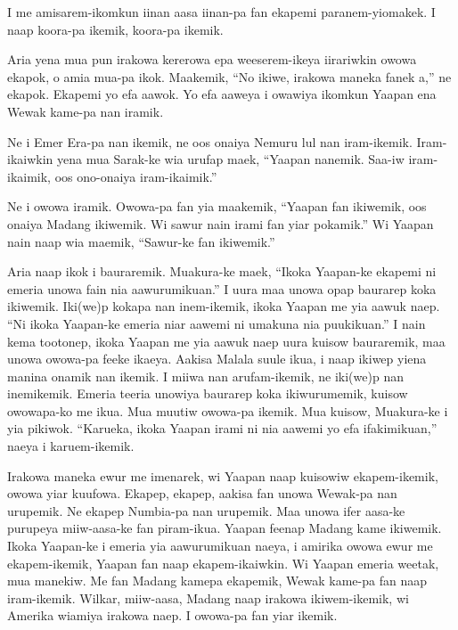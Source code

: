 I  me  amisarem-ikomkun  iinan  aasa  iinan-pa  fan  ekapemi  paranem-yiomakek. 
I  naap  koora-pa  ikemik,  koora-pa  ikemik. 

Aria  yena  mua  pun  irakowa  kererowa  epa weeserem-ikeya  iirariwkin  owowa  ekapok, o  amia  mua-pa  ikok. 
Maakemik,  “No  ikiwe,  irakowa  maneka  fanek a,”  ne  ekapok. 
Ekapemi  yo  efa  aawok. 
Yo  efa  aaweya  i  owawiya  ikomkun   Yaapan ena  Wewak  kame-pa  nan  iramik.

Ne  i  Emer  Era-pa  nan  ikemik,  ne  oos   onaiya  Nemuru  lul  nan  iram-ikemik. 
Iram-ikaiwkin  yena  mua  Sarak-ke  wia  urufap  maek,  “Yaapan  nanemik. 
Saa-iw  iram-ikaimik,  oos  ono-onaiya       iram-ikaimik.”

Ne  i  owowa  iramik. 
Owowa-pa  fan  yia  maakemik,  “Yaapan  fan  ikiwemik,       oos  onaiya  Madang  ikiwemik. 
Wi  sawur  nain  irami  fan  yiar  pokamik.” 
Wi  Yaapan  nain  naap  wia  maemik,  “Sawur-ke       fan  ikiwemik.” 

Aria  naap  ikok  i  bauraremik. 
Muakura-ke  maek,  ``Ikoka  Yaapan-ke  ekapemi  ni       emeria  unowa  fain  nia  aawurumikuan.” 
I  uura  maa  unowa  opap  baurarep  koka       ikiwemik. 
Iki(we)p  kokapa  nan  inem-ikemik,       ikoka  Yaapan  me  yia  aawuk  naep. 
“Ni  ikoka  Yaapan-ke  emeria  niar  aawemi   ni  umakuna  nia  puukikuan.” 
I  nain  kema  tootonep,  ikoka  Yaapan  me  yia       aawuk  naep  uura  kuisow  bauraremik, maa  unowa  owowa-pa  feeke  ikaeya. 
Aakisa  Malala  suule  ikua,  i  naap  ikiwep yiena  manina  onamik  nan  ikemik. 
I  miiwa  nan  arufam-ikemik,  ne  iki(we)p  nan  inemikemik. 
Emeria  teeria  unowiya  baurarep  koka   ikiwurumemik,  kuisow  owowapa-ko  me  ikua. 
Mua  muutiw  owowa-pa  ikemik. 
Mua  kuisow,  Muakura-ke  i  yia  pikiwok. 
“Karueka,  ikoka  Yaapan  irami  ni  nia  aawemi  yo  efa  ifakimikuan,”  naeya i  karuem-ikemik. 

Irakowa  maneka  ewur  me  imenarek,      wi  Yaapan  naap  kuisowiw  ekapem-ikemik, owowa  yiar  kuufowa.   
Ekapep,  ekapep,  aakisa  fan  unowa  Wewak-pa  nan  urupemik. 
Ne  ekapep  Numbia-pa  nan  urupemik. 
Maa  unowa  ifer  aasa-ke  purupeya  miiw-aasa-ke fan  piram-ikua.
Yaapan  feenap  Madang  kame  ikiwemik. 
Ikoka  Yaapan-ke  i  emeria  yia  aawurumikuan naeya,  i  amirika  owowa  ewur  me ekapem-ikemik,  Yaapan  fan  naap  ekapem-ikaiwkin. 
Wi  Yaapan  emeria  weetak,  mua  manekiw. 
Me  fan  Madang  kamepa  ekapemik, Wewak  kame-pa  fan  naap  iram-ikemik. 
Wilkar,  miiw-aasa,  Madang  naap  irakowa  ikiwem-ikemik, wi  Amerika  wiamiya  irakowa  naep. 
I  owowa-pa  fan  yiar  ikemik. 

